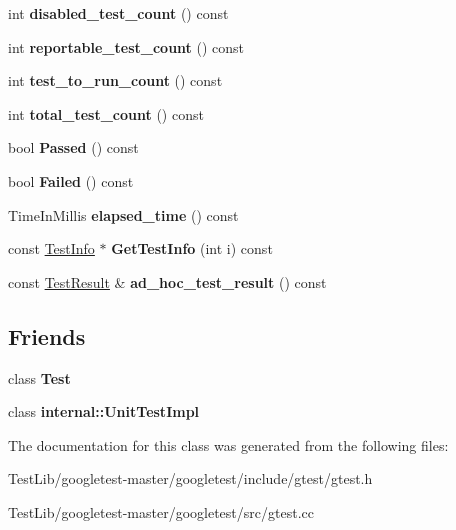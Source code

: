 \begin{DoxyCompactItemize}
int {\bfseries disabled\+\_\+test\+\_\+count} () const
\item 
\mbox{\label{classtesting_1_1TestCase_ae4e69f1a77b6aba274981e987e50acab}} 
int {\bfseries reportable\+\_\+test\+\_\+count} () const
\item 
\mbox{\label{classtesting_1_1TestCase_a57f115315eb756e23be6651bb5e6c638}} 
int {\bfseries test\+\_\+to\+\_\+run\+\_\+count} () const
\item 
\mbox{\label{classtesting_1_1TestCase_aba3cab19aaf7295284f0832f2cf895a3}} 
int {\bfseries total\+\_\+test\+\_\+count} () const
\item 
\mbox{\label{classtesting_1_1TestCase_a29bbfd227b732a90198b5280c039c271}} 
bool {\bfseries Passed} () const
\item 
\mbox{\label{classtesting_1_1TestCase_ae71c30eab6f1673b82090a0e745c2aa5}} 
bool {\bfseries Failed} () const
\item 
\mbox{\label{classtesting_1_1TestCase_acd7d6a77bce06da6ef90f5dad1c4def1}} 
Time\+In\+Millis {\bfseries elapsed\+\_\+time} () const
\item 
\mbox{\label{classtesting_1_1TestCase_a441e0eca232643671dc365c2924c255c}} 
const \hyperlink{classtesting_1_1TestInfo}{Test\+Info} $\ast$ {\bfseries Get\+Test\+Info} (int i) const
\item 
\mbox{\label{classtesting_1_1TestCase_a6d5fc5003bc3352f3ddae7dadc6d2364}} 
const \hyperlink{classtesting_1_1TestResult}{Test\+Result} \& {\bfseries ad\+\_\+hoc\+\_\+test\+\_\+result} () const
\end{DoxyCompactItemize}
\subsection*{Friends}
\begin{DoxyCompactItemize}
\item 
\mbox{\label{classtesting_1_1TestCase_a5b78b1c2e1fa07ffed92da365593eaa4}} 
class {\bfseries Test}
\item 
\mbox{\label{classtesting_1_1TestCase_acc0a5e7573fd6ae7ad1878613bb86853}} 
class {\bfseries internal\+::\+Unit\+Test\+Impl}
\end{DoxyCompactItemize}


The documentation for this class was generated from the following files\+:\begin{DoxyCompactItemize}
\item 
Test\+Lib/googletest-\/master/googletest/include/gtest/gtest.\+h\item 
Test\+Lib/googletest-\/master/googletest/src/gtest.\+cc\end{DoxyCompactItemize}
